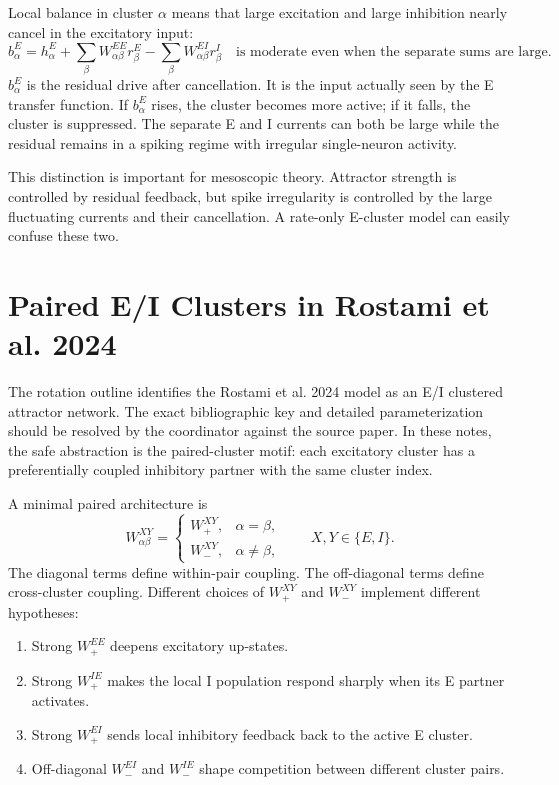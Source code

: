 Local balance in cluster $\alpha$ means that large excitation and large inhibition nearly cancel in the excitatory input:
%
\begin{equation}
  b_{\alpha}^{E}
  =
  h_{\alpha}^{E}
  +
  \sum_{\beta}W_{\alpha\beta}^{EE}r_{\beta}^{E}
  -
  \sum_{\beta}W_{\alpha\beta}^{EI}r_{\beta}^{I}
  \quad
  \text{is moderate even when the separate sums are large.}
  \label{eq:local-balance-residual}
\end{equation}
%
$b_{\alpha}^{E}$ is the residual drive after cancellation. It is the input actually seen by the E transfer function. If $b_{\alpha}^{E}$ rises, the cluster becomes more active; if it falls, the cluster is suppressed. The separate E and I currents can both be large while the residual remains in a spiking regime with irregular single-neuron activity.

This distinction is important for mesoscopic theory. Attractor strength is controlled by residual feedback, but spike irregularity is controlled by the large fluctuating currents and their cancellation. A rate-only E-cluster model can easily confuse these two.

\section{Paired E/I Clusters in Rostami et al. 2024}
\label{sec:paired-ei-clusters-rostami}

The rotation outline identifies the Rostami et al. 2024 model as an E/I clustered attractor network. The exact bibliographic key and detailed parameterization should be resolved by the coordinator against the source paper. In these notes, the safe abstraction is the paired-cluster motif: each excitatory cluster has a preferentially coupled inhibitory partner with the same cluster index.

A minimal paired architecture is
%
\begin{equation}
  W_{\alpha\beta}^{XY}
  =
  \begin{cases}
    W_{+}^{XY}, & \alpha=\beta,\\
    W_{-}^{XY}, & \alpha\ne\beta,
  \end{cases}
  \qquad
  X,Y\in\{E,I\}.
  \label{eq:paired-ei-coupling}
\end{equation}
%
The diagonal terms define within-pair coupling. The off-diagonal terms define cross-cluster coupling. Different choices of $W_{+}^{XY}$ and $W_{-}^{XY}$ implement different hypotheses:
%
\begin{enumerate}[leftmargin=*]
  \item Strong $W_{+}^{EE}$ deepens excitatory up-states.
  \item Strong $W_{+}^{IE}$ makes the local I population respond sharply when its E partner activates.
  \item Strong $W_{+}^{EI}$ sends local inhibitory feedback back to the active E cluster.
  \item Off-diagonal $W_{-}^{EI}$ and $W_{-}^{IE}$ shape competition between different cluster pairs.
\end{enumerate}

